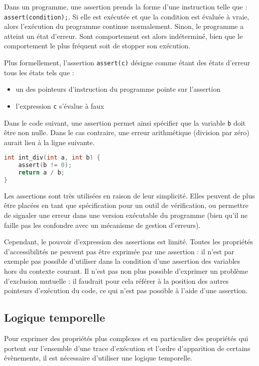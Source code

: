 Dans un programme, une assertion prends la forme d'une instruction telle que :
\lstinline!assert(condition);!.
Si elle est exécutée et que la condition est évaluée à vraie, alors l'exécution
du programme continue normalement.
Sinon, le programme a atteint un état d'erreur. Sont comportement est alors
indéterminé, bien que le comportement le plus fréquent soit de stopper son
exécution.

Plus formellement, l'assertion \lstinline!assert(c)! désigne comme étant des
états d'erreur tous les états tels que :

\begin{itemize}
\item
  un des pointeurs d'instruction du programme pointe sur l'assertion
\item
  l'expression \lstinline!c! s'évalue à faux
\end{itemize}

Dans le code suivant, une assertion permet ainsi spécifier que la variable
\lstinline!b! doit être non nulle. Dans le cas contraire, une erreur
arithmétique (division par zéro) aurait lieu à la ligne suivante.

\begin{lstlisting}[language=C]
int int_div(int a, int b) {
    assert(b != 0);
    return a / b;
}
\end{lstlisting}

Les assertions sont très utilisées en raison de leur simplicité.
Elles peuvent de plus être placées en tant que spécification pour un outil de
vérification, ou permettre de signaler une erreur dans une version exécutable
du programme (bien qu'il ne faille pas les confondre avec un mécanisme de
gestion d'erreurs).

Cependant, le pouvoir d'expression des assertions est limité. Toutes les
propriétés d'accessibilités ne peuvent pas être exprimée par une assertion : il
n'est par exemple pas possible d'utiliser dans la condition d'une assertion des
variables hors du contexte courant. Il n'est pas non plus possible d'exprimer un
problème d'exclusion mutuelle : il faudrait pour cela référer à la position des
autres pointeurs d'exécution du code, ce qui n'est pas possible à l'aide d'une
assertion.

\subsection{Logique temporelle}

Pour exprimer des propriétés plus complexes et en particulier des propriétés qui
portent sur l'ensemble d'une trace d'exécution et l'ordre d'apparition de
certains évènements, il est nécessaire d'utiliser une logique temporelle.

